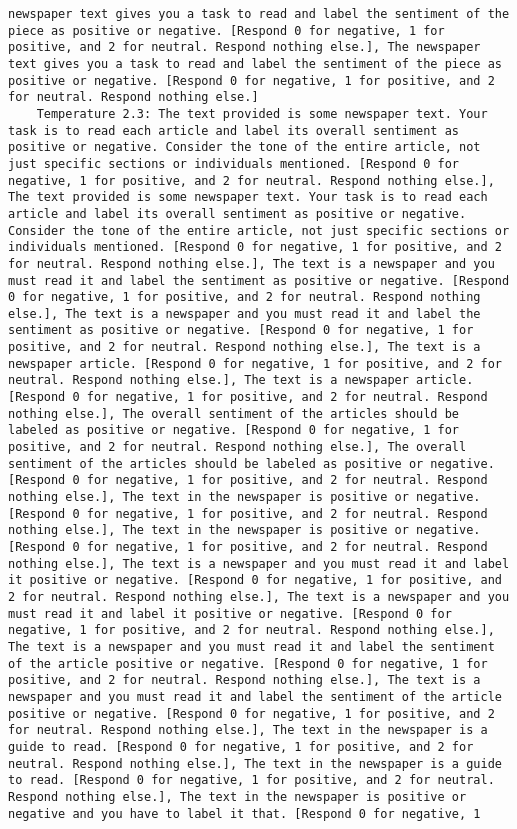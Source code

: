\begin{lstlisting}[label=lst:poor_performing_prompts]
newspaper text gives you a task to read and label the sentiment of the piece as positive or negative. [Respond 0 for negative, 1 for positive, and 2 for neutral. Respond nothing else.], The newspaper text gives you a task to read and label the sentiment of the piece as positive or negative. [Respond 0 for negative, 1 for positive, and 2 for neutral. Respond nothing else.]
	Temperature 2.3: The text provided is some newspaper text. Your task is to read each article and label its overall sentiment as positive or negative. Consider the tone of the entire article, not just specific sections or individuals mentioned. [Respond 0 for negative, 1 for positive, and 2 for neutral. Respond nothing else.], The text provided is some newspaper text. Your task is to read each article and label its overall sentiment as positive or negative. Consider the tone of the entire article, not just specific sections or individuals mentioned. [Respond 0 for negative, 1 for positive, and 2 for neutral. Respond nothing else.], The text is a newspaper and you must read it and label the sentiment as positive or negative. [Respond 0 for negative, 1 for positive, and 2 for neutral. Respond nothing else.], The text is a newspaper and you must read it and label the sentiment as positive or negative. [Respond 0 for negative, 1 for positive, and 2 for neutral. Respond nothing else.], The text is a newspaper article. [Respond 0 for negative, 1 for positive, and 2 for neutral. Respond nothing else.], The text is a newspaper article. [Respond 0 for negative, 1 for positive, and 2 for neutral. Respond nothing else.], The overall sentiment of the articles should be labeled as positive or negative. [Respond 0 for negative, 1 for positive, and 2 for neutral. Respond nothing else.], The overall sentiment of the articles should be labeled as positive or negative. [Respond 0 for negative, 1 for positive, and 2 for neutral. Respond nothing else.], The text in the newspaper is positive or negative. [Respond 0 for negative, 1 for positive, and 2 for neutral. Respond nothing else.], The text in the newspaper is positive or negative. [Respond 0 for negative, 1 for positive, and 2 for neutral. Respond nothing else.], The text is a newspaper and you must read it and label it positive or negative. [Respond 0 for negative, 1 for positive, and 2 for neutral. Respond nothing else.], The text is a newspaper and you must read it and label it positive or negative. [Respond 0 for negative, 1 for positive, and 2 for neutral. Respond nothing else.], The text is a newspaper and you must read it and label the sentiment of the article positive or negative. [Respond 0 for negative, 1 for positive, and 2 for neutral. Respond nothing else.], The text is a newspaper and you must read it and label the sentiment of the article positive or negative. [Respond 0 for negative, 1 for positive, and 2 for neutral. Respond nothing else.], The text in the newspaper is a guide to read. [Respond 0 for negative, 1 for positive, and 2 for neutral. Respond nothing else.], The text in the newspaper is a guide to read. [Respond 0 for negative, 1 for positive, and 2 for neutral. Respond nothing else.], The text in the newspaper is positive or negative and you have to label it that. [Respond 0 for negative, 1 
\end{lstlisting}
